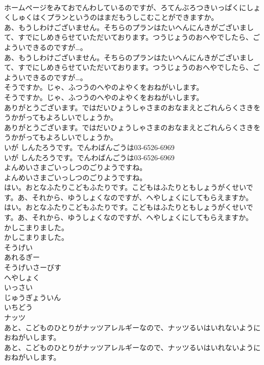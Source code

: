 \documentclass[8pt]{extreport}
\begin{document}
\begin{CJK}{UTF8}{min}
\\	ホームページをみておでんわしているのですが、ろてんぶろつきいっぱくにしょくしゅくはくプランというのはまだもうしこむことができますか。
\\	あ、もうしわけございません。そちらのプランはたいへんにんきがございまして、すでにしめきらせていただいております。つうじょうのおへやでしたら、ごよういできるのですが…。
\\	あ、もうしわけございません。そちらのプランはたいへんにんきがございまして、すでにしめきらせていただいております。つうじょうのおへやでしたら、ごよういできるのですが…。
\\	そうですか。じゃ、ふつうのへやのよやくをおねがいします。
\\	そうですか。じゃ、ふつうのへやのよやくをおねがいします。
\\	ありがとうございます。ではだいひょうしゃさまのおなまえとごれんらくさきをうかがってもよろしいでしょうか。
\\	ありがとうございます。ではだいひょうしゃさまのおなまえとごれんらくさきをうかがってもよろしいでしょうか。
\\	いが しんたろうです。でんわばんごうは03-6526-6969
\\	いが しんたろうです。でんわばんごうは03-6526-6969
\\	よんめいさまごいっしつのごりようですね。
\\	よんめいさまごいっしつのごりようですね。
\\	はい。おとなふたりこどもふたりです。こどもはふたりともしょうがくせいです。あ、それから、ゆうしょくなのですが、へやしょくにしてもらえますか。
\\	はい。おとなふたりこどもふたりです。こどもはふたりともしょうがくせいです。あ、それから、ゆうしょくなのですが、へやしょくにしてもらえますか。
\\	かしこまりました。
\\	かしこまりました。
\\	そうげい
\\	あれるぎー
\\	そうげいさーびす
\\	へやしょく
\\	いっさい
\\	じゅうぎょういん
\\	いちどう
\\	ナッツ
\\	あと、こどものひとりがナッツアレルギーなので、ナッツるいはいれないようにおねがいします。
\\	あと、こどものひとりがナッツアレルギーなので、ナッツるいはいれないようにおねがいします。

\end{CJK}
\end{document}
